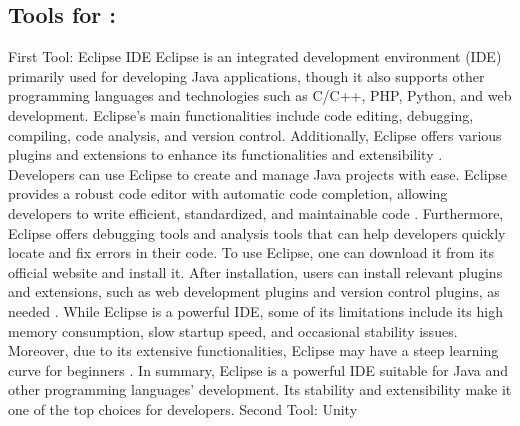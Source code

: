 \documentclass[a4paper, 11pt]{report}
\begin{document}
\subsection{Tools for \majC: \studA}
First Tool: Eclipse IDE\newline
Eclipse is an integrated development environment (IDE) primarily used for developing Java applications, though it also supports other programming languages and technologies such as C/C++, PHP, Python, and web development\cite{EDUCBA}. Eclipse's main functionalities include code editing, debugging, compiling, code analysis, and version control. Additionally, Eclipse offers various plugins and extensions to enhance its functionalities and extensibility \cite{SoftwareAdvice}. Developers can use Eclipse to create and manage Java projects with ease. Eclipse provides a robust code editor with automatic code completion, allowing developers to write efficient, standardized, and maintainable code \cite{JAVATPOINT}. Furthermore, Eclipse offers debugging tools and analysis tools that can help developers quickly locate and fix errors in their code. To use Eclipse, one can download it from its official website and install it. After installation, users can install relevant plugins and extensions, such as web development plugins and version control plugins, as needed \cite{JAVATPOINT}. While Eclipse is a powerful IDE, some of its limitations include its high memory consumption, slow startup speed, and occasional stability issues. Moreover, due to its extensive functionalities, Eclipse may have a steep learning curve for beginners \cite{SoftwareAdvice}. In summary, Eclipse is a powerful IDE suitable for Java and other programming languages' development. Its stability and extensibility make it one of the top choices for developers.\newline\newline
Second Tool: Unity\newline
\end{document}
